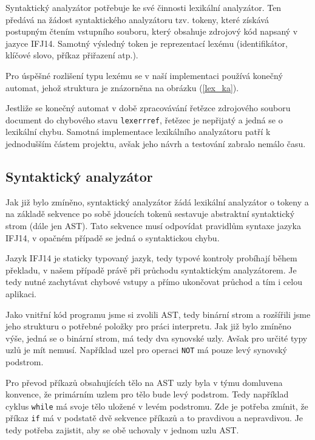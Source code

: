 \documentclass[12pt,a4paper,titlepage,final]{article}
\begin{document}
Syntaktický analyzátor potřebuje ke své činnosti lexikální analyzátor. Ten
předává na žádost syntaktického analyzátoru tzv. tokeny, které získává postupným
čtením vstupního souboru, který obsahuje zdrojový kód napsaný v jazyce IFJ14.
Samotný výsledný token je reprezentací lexému (identifikátor, klíčové slovo,
příkaz přiřazení atp.).

Pro úspěšné rozlišení typu lexému se v naší implementaci používá konečný
automat, jehož struktura je znázorněna na obrázku (\ref{lex_ka}).

Jestliže se konečný automat v době zpracovávání řetězce zdrojového souboru
document do chybového stavu \verb|lexerrref|, řetězec je nepřijatý a jedná se
o lexikální chybu. Samotná implementace lexikálního analyzátoru patří k
jednodušším částem projektu, avšak jeho návrh a testování zabralo nemálo času.


\subsection{Syntaktický analyzátor} \label{syntakticky_analyzator}
Jak již bylo zmíněno, syntaktický analyzátor žádá lexikální analyzátor o tokeny
a na základě sekvence po sobě jdoucích tokenů sestavuje abstraktní syntaktický
strom (dále jen AST). Tato sekvence musí odpovídat pravidlům syntaxe jazyka IFJ14,
v opačném případě se jedná o syntaktickou chybu.

Jazyk IFJ14 je staticky typovaný jazyk, tedy typové kontroly probíhají během 
překladu, v našem případě právě při průchodu syntaktickým analyzátorem. Je tedy
nutné zachytávat chybové vstupy a přímo ukončovat průchod a tím i celou aplikaci.

Jako vnitřní kód programu jsme si zvolili AST, tedy binární strom a rozšířili jsme
jeho strukturu o potřebné položky pro práci interpretu. Jak již bylo zmíněno výše,
jedná se o binární strom, má tedy dva synovské uzly. Avšak pro určité typy uzlů
je mít nemusí. Například uzel pro operaci \verb|NOT| má pouze levý synovský podstrom.

Pro převod příkazů obsahujících tělo na AST uzly byla v týmu domluvena konvence,
že primárním uzlem pro tělo bude levý podstrom. Tedy například cyklus \verb|while|
má svoje tělo uložené v levém podstromu. Zde je potřeba zmínit, že příkaz \verb|if|
má v podstatě dvě sekvence příkazů a to pravdivou a nepravdivou. Je tedy potřeba
zajistit, aby se obě uchovaly v jednom uzlu AST.
\end{document}
